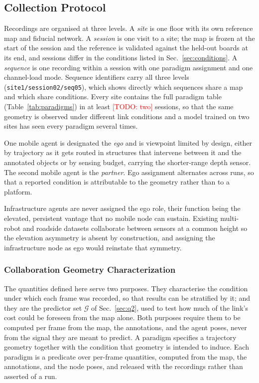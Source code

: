 \documentclass[conference]{IEEEtran}
\newcommand{\todo}[1]{\textcolor{red}{[TODO: #1]}}
\begin{document}


\subsection{Collection Protocol}
\label{sec:protocol}
Recordings are organised at three levels. A \emph{site} is one floor
with its own reference map and fiducial network. A \emph{session} is
one visit to a site; the map is frozen at the start of the session
and the reference is validated against the held-out boards at its
end, and sessions differ in the conditions listed in
Sec.~\ref{sec:conditions}. A \emph{sequence} is one recording within
a session with one paradigm assignment and one channel-load mode.
Sequence identifiers carry all three levels
(\texttt{site1/session02/seq05}), which shows directly which
sequences share a map and which share conditions. Every site
contains the full paradigm table (Table~\ref{tab:paradigms}) in at
least \todo{two} sessions, so that the same geometry is observed
under different link conditions and a model trained on two sites has
seen every paradigm several times.

One mobile agent is designated the \textit{ego} and is viewpoint
limited by design, either by trajectory as it gets routed in
structures that intervene between it and the annotated objects or by
sensing budget, carrying the shorter-range depth sensor. The second
mobile agent is the \textit{partner}. Ego assignment alternates across
runs, so that a reported condition is attributable to the geometry
rather than to a platform.

Infrastructure agents are never assigned the ego role, their function
being the elevated, persistent vantage that no mobile node can
sustain. Existing multi-robot and roadside datasets collaborate
between sensors at a common height \cite{s3e,inscope} so the elevation
asymmetry is absent by construction, and assigning the infrastructure
node as ego would reinstate that symmetry.



\subsubsection{Collaboration Geometry Characterization}
\label{sec:paradigms}



The quantities defined here serve two purposes. They characterise the
condition under which each frame was recorded, so that results can be
stratified by it; and they are the predictor set $\mathcal{G}$ of
Sec.~\ref{sec:q2}, used to test how much of the link's cost could
be foreseen from the map alone. Both purposes require them to be
computed per frame from the map, the annotations, and the agent poses,
never from the signal they are meant to predict. A paradigm specifies
a trajectory geometry together with the condition that geometry is
intended to induce. Each paradigm is a predicate over per-frame
quantities, computed from the map, the annotations, and the node
poses, and released with the recordings rather than asserted of a run.
\end{document}

